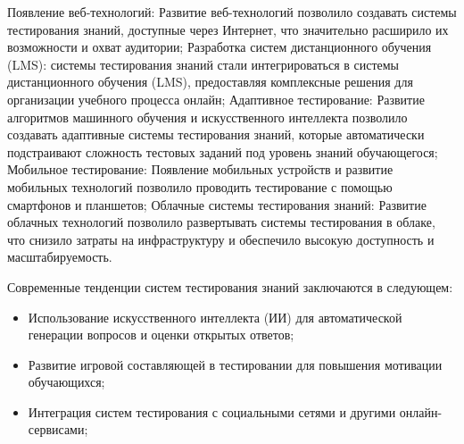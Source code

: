 \begin{enumerate}
	Появление веб-технологий: Развитие веб-технологий позволило создавать системы тестирования знаний, доступные через Интернет, что значительно расширило их возможности и охват аудитории;
	Разработка систем дистанционного обучения (LMS): системы тестирования знаний стали интегрироваться в системы дистанционного обучения (LMS), предоставляя комплексные решения для организации учебного процесса онлайн;
	Адаптивное тестирование: Развитие алгоритмов машинного обучения и искусственного интеллекта позволило создавать адаптивные системы тестирования знаний, которые автоматически подстраивают сложность тестовых заданий под уровень знаний обучающегося;
	Мобильное тестирование: Появление мобильных устройств и развитие мобильных технологий позволило проводить тестирование с помощью смартфонов и планшетов;
	Облачные системы тестирования знаний: Развитие облачных технологий позволило развертывать системы тестирования в облаке, что снизило затраты на инфраструктуру и обеспечило высокую доступность и масштабируемость.
\end{enumerate}

Современные тенденции систем тестирования знаний заключаются в следующем:
\begin{itemize}
	\item Использование искусственного интеллекта (ИИ) для автоматической генерации вопросов и оценки открытых ответов;
	\item Развитие игровой составляющей в тестировании для повышения мотивации обучающихся;
	\item Интеграция систем тестирования с социальными сетями и другими онлайн-сервисами;
\end{itemize} 